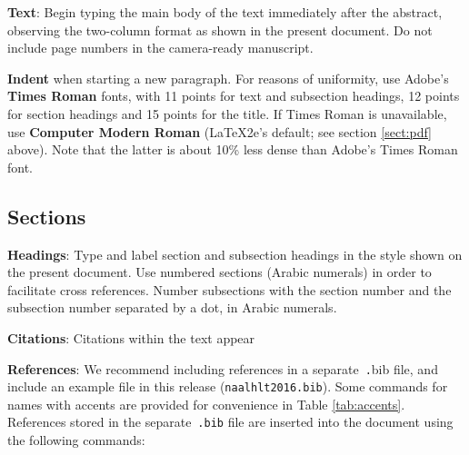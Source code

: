 \documentclass[11pt,letterpaper]{article}
\newcommand\BibTeX{B{\sc ib}\TeX}
\begin{document}
{\bf Text}: Begin typing the main body of the text immediately after
the abstract, observing the two-column format as shown in 
the present document.  Do not include page numbers in the camera-ready manuscript.  

{\bf Indent} when starting a new paragraph. For reasons of uniformity,
use Adobe's {\bf Times Roman} fonts, with 11 points for text and 
subsection headings, 12 points for section headings and 15 points for
the title.  If Times Roman is unavailable, use {\bf Computer Modern
  Roman} (\LaTeX2e{}'s default; see section \ref{sect:pdf} above).
Note that the latter is about 10\% less dense than Adobe's Times Roman
font.

\subsection{Sections}

{\bf Headings}: Type and label section and subsection headings in the
style shown on the present document.  Use numbered sections (Arabic
numerals) in order to facilitate cross references. Number subsections
with the section number and the subsection number separated by a dot,
in Arabic numerals. 

{\bf Citations}: Citations within the text appear

\textbf{References}:  We recommend
including references in a separate~{\small\texttt .bib} file, and include an example file 
in this release ({\small\tt naalhlt2016.bib}).  Some commands
for names with accents are provided for convenience in Table \ref{tab:accents}.  
References stored in the separate~{\small\tt .bib} file are inserted into the document using the following commands:

\small
\begin{verbatim}
\end{verbatim}
\normalsize 

\end{document}

